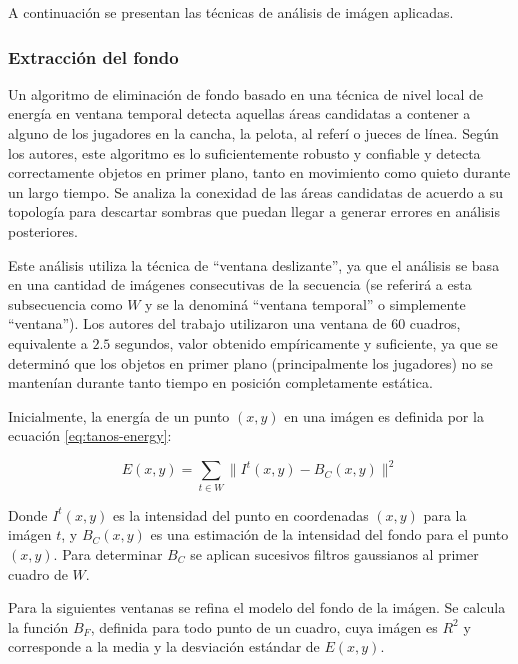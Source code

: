 \documentclass[a4paper,10pt]{article}
\begin{document}
A continuación se presentan las técnicas de análisis de imágen aplicadas.

\subsubsection{Extracción del fondo}
Un algoritmo de eliminación de fondo basado en una técnica de nivel local de
energía en ventana temporal detecta aquellas áreas candidatas a contener a
alguno de los jugadores en la cancha, la pelota, al referí o jueces de línea.
Según los autores, este algoritmo es lo suficientemente robusto y confiable y
detecta correctamente objetos en primer plano, tanto en movimiento como quieto
durante un largo tiempo. Se analiza la conexidad de las áreas candidatas de
acuerdo a su topología para descartar sombras que puedan llegar a generar
errores en análisis posteriores.

Este análisis utiliza la técnica de ``ventana deslizante'', ya que el análisis
se basa en una cantidad de imágenes consecutivas de la secuencia (se referirá a
esta subsecuencia como $W$ y se la denominá ``ventana temporal'' o simplemente
``ventana''). Los autores del trabajo utilizaron una ventana de 60 cuadros,
equivalente a $2.5$ segundos, valor obtenido empíricamente y suficiente, ya que
se determinó que los objetos en primer plano (principalmente los jugadores) no
se mantenían durante tanto tiempo en posición completamente estática.

Inicialmente, la energía de un punto $(x, y)$ en una imágen es definida por la
ecuación \ref{eq:tanos-energy}:

\begin{equation}
    \label{eq:tanos-energy}
    E(x, y) = \sum_{t \in W} \| I^t(x, y) - B_C (x, y) \| ^2
\end{equation}

Donde  $I^t(x, y)$ es la intensidad del punto en coordenadas $(x, y)$ para la
imágen $t$, y $B_C(x, y)$ es una estimación de la intensidad del fondo para el
punto $(x, y)$. Para determinar $B_C$ se aplican sucesivos filtros gaussianos
al primer cuadro de $W$.

Para la siguientes ventanas se refina el modelo del fondo de la imágen. Se
calcula la función $B_F$, definida para todo punto de un cuadro, cuya imágen es
$R^2$ y corresponde a la media y la desviación estándar de $E(x, y)$.
\end{document}
